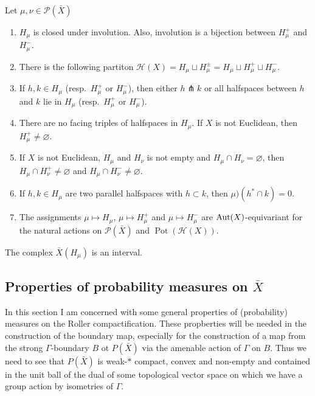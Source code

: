 \begin{lemma}[{\cite[Lem.\ 4.6]{MR3509968}}]
  Let \(\mu,\nu \in \mathcal{P}(\bar X)\)
  \begin{enumerate}
  \item \(H_\mu\) is closed under involution. Also, involution is a bijection between \(H_\mu^+\) and \(H_\mu^-\).
  \item There is the following partiton \(\mathcal{H}(X) = H_\mu \sqcup H_\mu^\pm = H_\mu \sqcup H_\mu^+ \sqcup H_\mu^-\).
  \item If \(h, k \in H_\mu\) (resp.\ \(H_\mu^+\) or \(H_\mu^-\)), then either \(h \pitchfork k\) or all halfspaces between \(h\) and \(k\) lie in \(H_\mu\) (resp.\ \(H_\mu^+\) or \(H_\mu^-\)).
  \item There are no facing triples of halfspaces in \(H_\mu\). If \(X\) is not Euclidean, then \(H_\mu^+ \neq \varnothing\).
  \item If \(X\) is not Euclidean, \(H_\mu\) and \(H_\nu\) is not empty and \(H_\mu \cap H_\nu = \varnothing\), then \(H_\mu \cap H_\nu^+ \neq \varnothing\) and \(H_\mu \cap H_\nu^- \neq \varnothing\).
  \item If \(h, k  \in H_\mu\) are two parallel halfspaces with \(h \subset k\), then \(\mu)(h^\ast \cap k) = 0\).
  \item The assignments \(\mu \mapsto H_\mu\), \(\mu \mapsto H_\mu^+\) and \(\mu \mapsto H_\mu^-\) are \(\operatorname{Aut}(X)\)-equivariant for the natural actions on \(\mathcal{P}(\bar X)\) and \(\operatorname{Pot}(\mathcal{H}(X))\).
  \end{enumerate}
\end{lemma}

\begin{lemma}[{\cite[Lem. 4.7]{MR3509968}}]
  The complex \(\bar X(H_\mu)\) is an interval.
\end{lemma}

\subsection{Properties of probability measures on \(\bar X\)}
\label{sec:prob}

In this section I am concerned with some general properties of (probability) measures on the Roller compactification. These propberties will be needed in the construction of the boundary map, especially for the construction of a map from the strong \(\Gamma\)-boundary \(B\) ot \(P(\bar X)\) via the amenable action of \(\Gamma\) on \(B\). Thus we need to see that \(P(\bar X)\) is weak-\(\ast\) compact, convex and non-empty and contained in the unit ball of the dual of some topological vector space on which we have a group action by isometries of \(\Gamma\).

